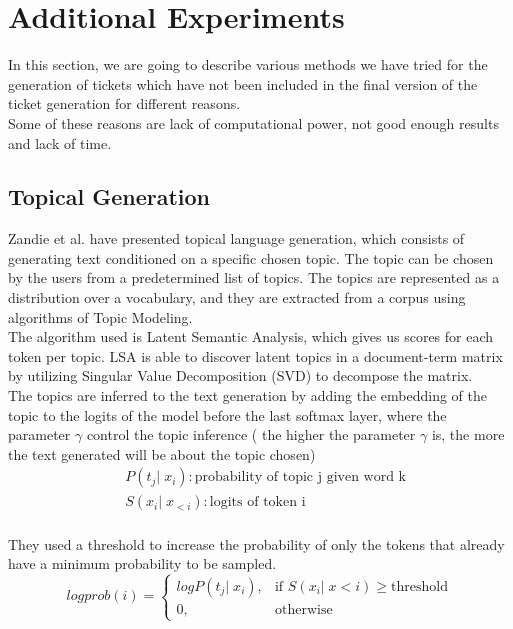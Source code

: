 \section{Additional Experiments}

In this section, we are going to describe various methods we have tried for the generation of tickets which have not been included in the final version of the ticket generation for different reasons. \\
Some of these reasons are lack of computational power, not good enough results and lack of time. \\

\subsection{Topical Generation}
Zandie et al.\cite{zandie2021topical} have presented topical language generation, which consists of generating text conditioned on a specific chosen topic. The topic can be chosen by the users from a predetermined list of topics. The topics are represented as a distribution over a vocabulary, and they are extracted from a corpus using algorithms of Topic Modeling. \\
The algorithm used is Latent Semantic Analysis, which gives us scores for each token per topic. LSA is able to discover latent topics in a document-term matrix by utilizing Singular Value Decomposition (SVD) to decompose the matrix. \\
The topics are inferred to the text generation by adding the embedding of the topic to the logits of the model before the last softmax layer, where the parameter $\gamma$ control the topic inference ( the higher the parameter $\gamma$ is, the more the text generated will be about the topic chosen)
\begin{equation*}
    \begin{split}
        & P(t_j|\;x_i): \text{probability of topic j given word k} \\
        & S(x_i|\;x_{<i}): \text{logits of token i} \\
    \end{split}    
\end{equation*}

They used a threshold to increase the probability of only the tokens that already have a minimum probability to be sampled.
\begin{equation*}
        logprob(i) = 
        \begin{cases}
            logP(t_j|\;x_i),& \text{if } S(x_i|\;x<i)\geq \text{threshold}\\
            0,              & \text{otherwise}
        \end{cases}
\end{equation*}

